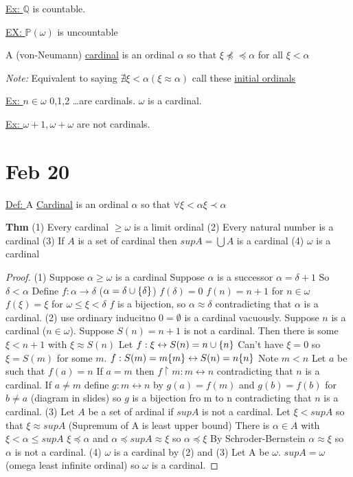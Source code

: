 \underline{Ex: } $\mathbb{Q}$ is countable.

\underline{EX: } $\mathbb{P}(\omega)$ is uncountable

 A (von-Neumann) \underline{cardinal} is an ordinal $\alpha$ so that $\xi \npreceq \preceq \alpha$ for all $\xi < \alpha$

\emph{Note: } Equivalent to saying $\nexists \xi < \alpha (\xi \approx \alpha)$
call these \underline{initial ordinals}

\underline{Ex: } $n \in \omega$ 0,1,2 \dots are cardinals.
$\omega$ is a cardinal.

\underline{Ex: } $\omega + 1, \omega + \omega$ are not cardinals.


\section{Feb 20}

\underline{Def: } A \underline{Cardinal} is an ordinal $\alpha$ so that $\forall \xi < \alpha \xi \prec \alpha$

\textbf{Thm}
(1) Every cardinal $\geq \omega$ is a limit ordinal
(2) Every natural number is a cardinal
(3) If $A$ is a set of cardinal then $supA = \bigcup A$ is a cardinal
(4) $\omega$ is a cardinal

\begin{proof}
(1) Suppose $\alpha \geq \omega$ is a cardinal
    Suppose $\alpha$ is a successor $\alpha = \delta + 1$
    So $\delta < \alpha$
    Define $f: \alpha \rightarrow \delta$ ($\alpha = \delta \cup \{\delta\}$)
    $f(\delta) = 0$
    $f(n) = n+1$ for $n \in \omega$
    $f(\xi) = \xi$ for $\omega \leq \xi < \delta$
    $f$ is a bijection, so $\alpha \approx \delta$ contradicting that $\alpha$ is a cardinal.
(2) use ordinary inducitno
    $0 = \emptyset$ is a cardinal vacuously.
    Suppose $n$ is a cardinal ($n \in \omega$).
    Suppose $S(n)=n+1$ is not a cardinal.
    Then there is some $\xi < n+1$ with $\xi \approx S(n)$
    Let $f : \xi \leftrightarrow S(n) = n \cup \{n\}$
    Can't have $\xi = 0$ so $\xi=S(m)$ for some $m$.
    $f : S(m) =m \{m\} \leftrightarrow S(n) = n \{n\}$
    Note $m < n$
    Let $a$ be such that $f(a) = n$
    If $a=m$ then $f \upharpoonright m : m \leftrightarrow n$ contradicting that $n$ is a cardinal.
    If $a \neq m$ define $g : m \leftrightarrow n$ by $g(a) = f(m)$ and $g(b) = f(b)$ for $b \neq a$
(diagram in slides)
    so $g$ is a bijection fro m to n contradicting that $n$ is a cardinal.
(3) Let $A$ be a set of  ardinal if $sup A$ is not a cardinal.
    Let $\xi < sup A$ so that $\xi \approx sup A$ (Supremum of A is least upper bound)
    There is $\alpha \in A$ with $\xi < \alpha \leq sup A$
    $\xi \preceq \alpha$ and $\alpha \preceq sup A \approx \xi$ so $\alpha \preceq \xi$
    By Schroder-Bernstein $\alpha \approx \xi$ so $\alpha$ is not a cardinal.
(4) $\omega$ is a cardinal by (2) and (3)
    Let A be $\omega$.
    $sup A = \omega$ (omega least infinite ordinal)
    so $\omega$ is a cardinal.
\end{proof}

